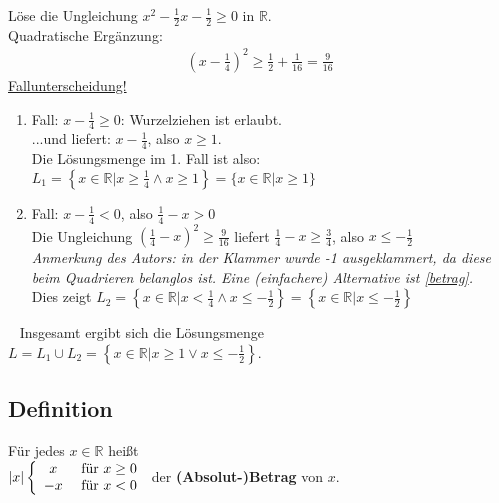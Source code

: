 	Löse die Ungleichung $x^2-\frac{1}{2}x-\frac{1}{2} \geq 0$ in $\mathbb{R}$.\\ \newline
	Quadratische Ergänzung:
	\begin{align*}
	\left( x - \frac{1}{4} \right) ^2 \geq \frac{1}{2} + \frac{1}{16} = \frac{9}{16}
	\end{align*}
	\underline{Fallunterscheidung!}\\
	
	\begin{enumerate}
	\item Fall: $x-\frac{1}{4} \geq 0$: Wurzelziehen ist erlaubt.\\
	...und liefert: $x-\frac{1}{4}$, also $x\geq 1$.\\ \newline
	Die Lösungsmenge im 1. Fall ist also:\\
	$L_1=\left\{x\in\mathbb{R}|x\geq\frac{1}{4} \land x\geq 1\right\}=\{x\in\mathbb{R}|x\geq 1\}$
	
	\item Fall: $x-\frac{1}{4}<0$, also $\frac{1}{4}-x>0$\\
	Die Ungleichung $(\frac{1}{4}-x)^2\geq \frac{9}{16}$ liefert 
	$\frac{1}{4}-x\geq\frac{3}{4}$, also $x\leq -\frac{1}{2}$\\ \newline
	\textit{Anmerkung des Autors: in der Klammer wurde -1 ausgeklammert, da diese beim Quadrieren belanglos ist.
	Eine (einfachere) Alternative ist \ref{betrag}.}\\
	\newline Dies zeigt $L_2=\left\{ x\in\mathbb{R}|x<\frac{1}{4} \land x\leq -\frac{1}{2}\right\} =
	\left\{ x\in \mathbb{R}|x\leq -\frac{1}{2}\right\}$
	\end{enumerate}
	~\newline
	Insgesamt ergibt sich die Lösungsmenge
	$L=L_1\cup L_2=\left\{ x\in\mathbb{R}|x\geq 1\lor x\leq -\frac{1}{2} \right\}$.
	
	
\subsection[Betrag]{Definition}

	Für jedes $x\in \mathbb{R}$ heißt\\ 
	
	$\vert x \vert \left\{  \begin{array}{cl}
                  			x 	&\textnormal{ für } x \geq 0\\
                  			-x 	&\textnormal{ für } x<0
                			\end{array}
                \right.$     der \textbf{(Absolut-)Betrag} von $x$.
                
